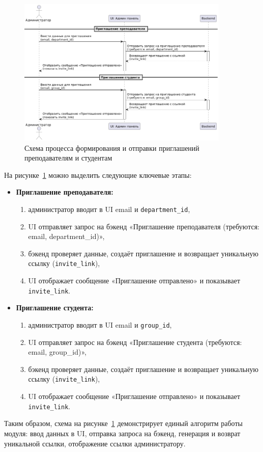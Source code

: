 \begin{figure}[H]
    \centering
    \includegraphics[width=0.9\textwidth]{static/diagrams/Admin.png}
    \caption{Схема процесса формирования и отправки приглашений преподавателям и студентам}
    \label{fig:admin-invite}
\end{figure}

На рисунке~\ref{fig:admin-invite} можно выделить следующие ключевые этапы:
\begin{itemize}
    \item \textbf{Приглашение преподавателя:}
    \begin{enumerate}
        \item администратор вводит в UI email и \texttt{department\_id},
        \item UI отправляет запрос на бэкенд «Приглашение преподавателя (требуются: email, department\_id)»,
        \item бэкенд проверяет данные, создаёт приглашение и возвращает уникальную ссылку (\texttt{invite\_link}),
        \item UI отображает сообщение «Приглашение отправлено» и показывает \texttt{invite\_link}.
    \end{enumerate}
    \item \textbf{Приглашение студента:}
    \begin{enumerate}
        \item администратор вводит в UI email и \texttt{group\_id},
        \item UI отправляет запрос на бэкенд «Приглашение студента (требуются: email, group\_id)»,
        \item бэкенд проверяет данные, создаёт приглашение и возвращает уникальную ссылку (\texttt{invite\_link}),
        \item UI отображает сообщение «Приглашение отправлено» и показывает \texttt{invite\_link}.
    \end{enumerate}
\end{itemize}

Таким образом, схема на рисунке~\ref{fig:admin-invite} демонстрирует единый алгоритм работы модуля: ввод данных в UI, отправка запроса на бэкенд, генерация и возврат уникальной ссылки, отображение ссылки администратору.
